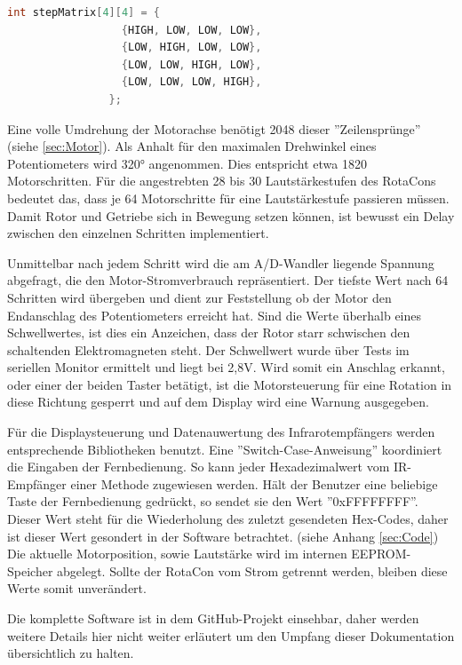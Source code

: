 \documentclass[11pt, titlepage, fleqn]{report}
\begin{document}
			\begin{lstlisting}[gobble=28, language=C++]
				int stepMatrix[4][4] = {
  				  {HIGH, LOW, LOW, LOW},
  				  {LOW, HIGH, LOW, LOW},
  				  {LOW, LOW, HIGH, LOW},
  				  {LOW, LOW, LOW, HIGH},
				};
			\end{lstlisting}

			Eine volle Umdrehung der Motorachse benötigt 2048 dieser ''Zeilensprünge'' (siehe \ref{sec:Motor}). Als Anhalt für den maximalen Drehwinkel eines Potentiometers wird 320° angenommen. Dies entspricht etwa 1820 Motorschritten. Für die angestrebten 28 bis 30 Lautstärkestufen des RotaCons bedeutet das, dass je 64 Motorschritte für eine Lautstärkestufe passieren müssen. Damit Rotor und Getriebe sich in Bewegung setzen können, ist bewusst ein Delay zwischen den einzelnen Schritten implementiert.

			Unmittelbar nach jedem Schritt wird die am A/D-Wandler liegende Spannung abgefragt, die den Motor-Stromverbrauch repräsentiert. Der tiefste Wert nach 64 Schritten wird übergeben und dient zur Feststellung ob der Motor den Endanschlag des Potentiometers erreicht hat. Sind die Werte überhalb eines Schwellwertes, ist dies ein Anzeichen, dass der Rotor starr schwischen den schaltenden Elektromagneten steht. Der Schwellwert wurde über Tests im seriellen Monitor ermittelt und liegt bei 2,8V.\newline
			Wird somit ein Anschlag erkannt, oder einer der beiden Taster betätigt, ist die Motorsteuerung für eine Rotation in diese Richtung gesperrt und auf dem Display wird eine Warnung ausgegeben.

			Für die Displaysteuerung und Datenauwertung des Infrarotempfängers werden entsprechende Bibliotheken benutzt. Eine ''Switch-Case-Anweisung'' koordiniert die Eingaben der Fernbedienung. So kann jeder Hexadezimalwert vom IR-Empfänger einer Methode zugewiesen werden. Hält der Benutzer eine beliebige Taste der Fernbedienung gedrückt, so sendet sie den Wert ''0xFFFFFFFF''. Dieser Wert steht für die Wiederholung des zuletzt gesendeten Hex-Codes, daher ist dieser Wert gesondert in der Software betrachtet. (siehe Anhang \ref{sec:Code}) 
			Die aktuelle Motorposition, sowie Lautstärke wird im internen EEPROM-Speicher abgelegt. Sollte der RotaCon vom Strom getrennt werden, bleiben diese Werte somit unverändert.
			
			Die komplette Software ist in dem GitHub-Projekt einsehbar, daher werden weitere Details hier nicht weiter erläutert um den Umpfang dieser Dokumentation übersichtlich zu halten.
		\newpage
\end{document}
